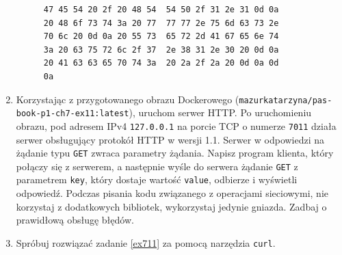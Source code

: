 \documentclass{article}
\begin{document}
\begin{enumerate}[label=\textbf{7.\arabic*}]
\begin{figure}[h!t!p!]
\centering
\begin{BVerbatim}
47 45 54 20 2f 20 48 54  54 50 2f 31 2e 31 0d 0a   
20 48 6f 73 74 3a 20 77  77 77 2e 75 6d 63 73 2e   
70 6c 20 0d 0a 20 55 73  65 72 2d 41 67 65 6e 74   
3a 20 63 75 72 6c 2f 37  2e 38 31 2e 30 20 0d 0a  
20 41 63 63 65 70 74 3a  20 2a 2f 2a 20 0d 0a 0d   
0a
\end{BVerbatim}
\end{figure}




\item \label{ex711} Korzystając z przygotowanego obrazu Dockerowego (\texttt{mazurkatarzyna/pas-book-p1-ch7-ex11:latest}), uruchom serwer HTTP.  Po uruchomieniu obrazu, pod adresem IPv4 \texttt{127.0.0.1} na porcie TCP o numerze \texttt{7011} działa serwer obsługujący protokół HTTP w wersji 1.1. Serwer w odpowiedzi na żądanie typu \texttt{GET} zwraca parametry żądania. Napisz program klienta, który połączy się z serwerem, a następnie wyśle do serwera żądanie \texttt{GET} z parametrem \texttt{key}, który dostaje wartość \texttt{value}, odbierze i wyświetli odpowiedź.  Podczas pisania kodu związanego z operacjami sieciowymi, nie korzystaj z dodatkowych bibliotek, wykorzystaj jedynie gniazda. Zadbaj o prawidłową obsługę błędów.

\item Spróbuj rozwiązać zadanie \ref{ex711} za pomocą narzędzia \texttt{curl}. 




\end{enumerate}
\end{document}
